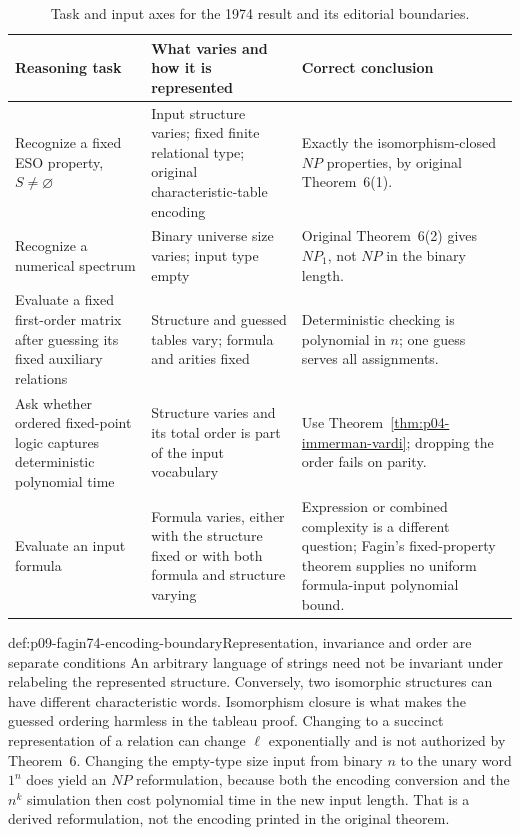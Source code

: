 \begin{table}[htbp]
\centering\small
\begin{tabular}{@{}p{}p{}p{}@{}}
\toprule
Reasoning task & What varies and how it is represented & Correct conclusion \\
\midrule
Recognize a fixed ESO property, \(S\ne\varnothing\) & Input structure varies;
fixed finite relational type; original characteristic-table encoding &
Exactly the isomorphism-closed \(NP\) properties, by original Theorem~6(1). \\
Recognize a numerical spectrum & Binary universe size varies; input type empty
& Original Theorem~6(2) gives \(NP_1\), not \(NP\) in the binary length. \\
Evaluate a fixed first-order matrix after guessing its fixed auxiliary relations
& Structure and guessed tables vary; formula and arities fixed & Deterministic
checking is polynomial in \(n\); one guess serves all assignments. \\
Ask whether ordered fixed-point logic captures deterministic polynomial time
& Structure varies and its total order is part of the input vocabulary &
Use Theorem~\ref{thm:p04-immerman-vardi}; dropping the order fails on parity. \\
Evaluate an input formula & Formula varies, either with the structure fixed or
with both formula and structure varying & Expression or combined complexity is
a different question; Fagin's fixed-property theorem supplies no uniform
formula-input polynomial bound. \\
\bottomrule
\end{tabular}
\caption{Task and input axes for the 1974 result and its editorial boundaries.}
\label{tab:p09-fagin74-input-axes}
\end{table}

\begin{hbwarning}{def:p09-fagin74-encoding-boundary}{Representation, invariance and order are separate conditions}
An arbitrary language of strings need not be invariant under relabeling the
represented structure.  Conversely, two isomorphic structures can have
different characteristic words.  Isomorphism closure is what makes the
guessed ordering harmless in the tableau proof.  Changing to a succinct
representation of a relation can change \(\ell\) exponentially and is not
authorized by Theorem~6.  Changing the empty-type size input from binary
\(n\) to the unary word \(1^n\) does yield an \(NP\) reformulation,
because both the encoding conversion and the \(n^k\) simulation then cost
polynomial time in the new input length.  That is a derived reformulation,
not the encoding printed in the original theorem.
\end{hbwarning}
